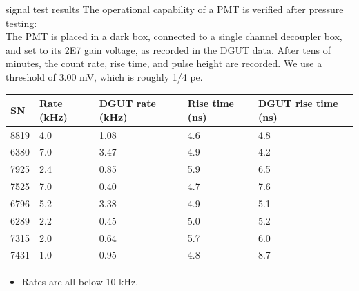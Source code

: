 \documentclass{beamer}
\begin{document}
\begin{frame}{signal test results}
	\small The operational capability of a PMT is verified after pressure testing:\\
	{\scriptsize The PMT is placed in a dark box, connected to a single channel decoupler box,
	and set to its 2E7 gain voltage, as recorded in the DGUT data. After tens of minutes,
	the count rate, rise time, and pulse height are recorded. We use a threshold of 3.00 
	mV, which is roughly 1/4 pe.
	}

	\setlength{\tabcolsep}{2pt}
	\small
	\begin{center}
	\begin{tabular}{|l|p{1.2cm}|p{1.9cm}|p{1.5cm}|p{1.7cm}|}
		\hline
		\textbf{SN}&\textbf{Rate (kHz)}&\textbf{DGUT rate (kHz)}&\textbf{Rise time (ns)}&
		\textbf{DGUT rise time (ns)}\\
		\hline
		\hline
		8819&4.0&1.08&4.6&4.8\\
		6380&7.0&3.47&4.9&4.2\\
		7925&2.4&0.85&5.9&6.5\\
		7525&7.0&0.40&4.7&7.6\\
		6796&5.2&3.38&4.9&5.1\\
		6289&2.2&0.45&5.0&5.2\\
		7315&2.0&0.64&5.7&6.0\\
		7431&1.0&0.95&4.8&8.7\\
		\hline
	\end{tabular}
		\begin{itemize}
			\item Rates are all below 10 kHz.
		\end{itemize}
	\end{center}
\end{frame}
\end{document}
